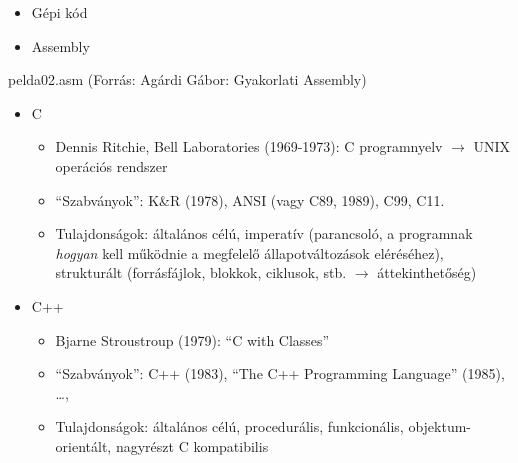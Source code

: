 \documentclass[usenames,dvipsnames,aspectratio=169]{beamer}
\begin{document}
\begin{frame}[fragile]
  \begin{itemize}
    \item Gépi kód
    \item Assembly
  \end{itemize}
  \begin{exampleblock}{pelda02.asm (Forrás: Agárdi Gábor: Gyakorlati Assembly)}
    \tiny
    
  \end{exampleblock}
\end{frame}

\begin{frame}
  \begin{itemize}
    \item C
    \begin{itemize}
      \item Dennis Ritchie, Bell Laboratories (1969-1973): C programnyelv $\rightarrow$ UNIX operációs rendszer
      \item ``Szabványok'': K\&R (1978), ANSI (vagy C89, 1989), C99, C11.
      \item Tulajdonságok: általános célú, imperatív (parancsoló, a programnak \emph{hogyan} kell működnie a megfelelő 
állapotváltozások eléréséhez), strukturált (forrásfájlok, blokkok, ciklusok, stb. $\rightarrow$ áttekinthetőség)   
    \end{itemize}
    \item C++
    \begin{itemize}
      \item Bjarne Stroustroup (1979): ``C with Classes''
      \item ``Szabványok'': C++ (1983), ``The C++ Programming Language'' (1985), \dots, 
      \item Tulajdonságok: általános célú, procedurális, funkcionális, objektum-orientált, nagyrészt C kompatibilis
    \end{itemize}
  \end{itemize}
\end{frame}
\end{document}
